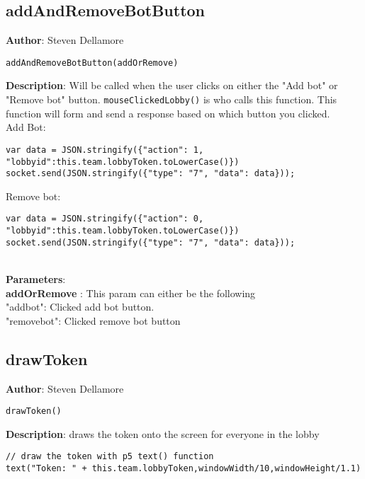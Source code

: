 \documentclass[12pt]{article}
\begin{document}
\subsection{addAndRemoveBotButton}
\textbf{Author}: Steven Dellamore 
\vspace*{1\baselineskip}
\begin{lstlisting}
addAndRemoveBotButton(addOrRemove)
\end{lstlisting} 
\vspace*{1\baselineskip}
\textbf{Description}: Will be called when the user clicks on either the "Add bot" or "Remove bot" button. \texttt{mouseClickedLobby()} is who calls this function. This function will form and send a response based on which button you clicked. \\Add Bot: 
\begin{verbatim}
var data = JSON.stringify({"action": 1, "lobbyid":this.team.lobbyToken.toLowerCase()})
socket.send(JSON.stringify({"type": "7", "data": data}));
\end{verbatim}
 Remove bot: 
\begin{verbatim}
var data = JSON.stringify({"action": 0, "lobbyid":this.team.lobbyToken.toLowerCase()})
socket.send(JSON.stringify({"type": "7", "data": data}));
\end{verbatim}
 


\textbf{\large{\\Parameters}}:\\
\textbf{addOrRemove }: This param can either be the following \\ "addbot": Clicked add bot button. \\ "removebot": Clicked remove bot button\\

\subsection{drawToken}
\textbf{Author}: Steven Dellamore 
\vspace*{1\baselineskip}
\begin{lstlisting}
drawToken()
\end{lstlisting} 
\vspace*{1\baselineskip}
\textbf{Description}: draws the token onto the screen for everyone in the lobby 
\begin{verbatim}
// draw the token with p5 text() function
text("Token: " + this.team.lobbyToken,windowWidth/10,windowHeight/1.1) 
\end{verbatim}
 
\end{document}
